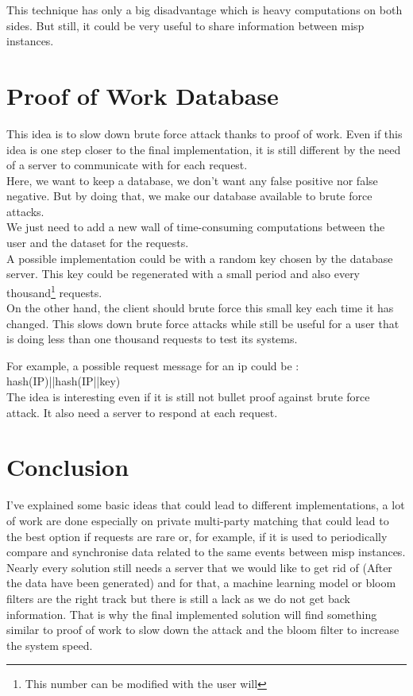 \documentclass{eplmastersthesis}
\begin{document}
This technique has only a big disadvantage which is heavy computations on both sides. But still, it could be very useful to share information between \gls{misp} instances.

\section{Proof of Work Database}
This idea is to slow down brute force attack thanks to proof of work. Even if this idea is one step closer to the final implementation, it is still different by the need of a server to communicate with for each request.\\

Here, we want to keep a database, we don't want any false positive nor false negative. But by doing that, we make our database available to brute force attacks.\\
We just need to add a new wall of time-consuming computations between the user and the dataset for the requests.\\

A possible implementation could be with a random key chosen by the database server. This key could be regenerated with a small period and also every thousand\footnote{This number can be modified with the user will} requests.\\
On the other hand, the client should brute force this small key each time it has changed. This slows down brute force attacks while still be useful for a user that is doing less than one thousand requests to test its systems.

For example, a possible request message for an \gls{ip} could be : hash(IP)||hash(IP||key)\\

The idea is interesting even if it is still not bullet proof against brute force attack. It also need a server to respond at each request.

\section{Conclusion}
I've explained some basic ideas that could lead to different implementations, a lot of work are done especially on private multi-party matching that could lead to the best option if requests are rare or, for example, if it is used to periodically compare and synchronise data related to the same events between \gls{misp} instances.\\
Nearly every solution still needs a server that we would like to get rid of (After the data have been generated) and for that, a machine learning model or bloom filters are the right track but there is still a lack as we do not get back information. That is why the final implemented solution will find something similar to proof of work to slow down the attack and the bloom filter to increase the system speed.
\end{document}
